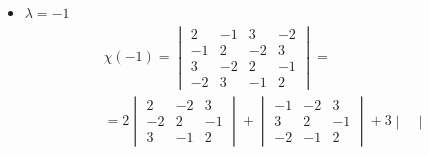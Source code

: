 \begin{itemize}
\begin{multline*}
\begin{vmatrix}
        	-2 & -1 \\
            3 & 0
        \end{vmatrix} + 3
        \begin{vmatrix}
        	3 & -2 \\
            -2 & 3
        \end{vmatrix} \right) + 2 \left( -
        \begin{vmatrix}
        	-2 & 0 \\
            3 & -1
        \end{vmatrix} - 2
        \begin{vmatrix}
        	3 & -2 \\
            -2 & 3
        \end{vmatrix} \right) = \\
        = 2(-2) + (1 - 9) + 3 \bigg( -(-(-3)) + 3(9 - 4) \bigg) + 2 \bigg( -(2) - 2(9 - 4) \bigg) = -4 - 8 + 3(-3 + 15) + 2(-2 - 10) = \\
        = -12 + 36 - 24 = 0
    \end{multline*}
    $$ \vec{u_1} =
    \begin{pmatrix}
    	1 \\
        1 \\
        1 \\
        1
    \end{pmatrix} $$
    \item $ \lambda = -1 $
    \begin{multline*}
        \chi(-1) =
        \begin{vmatrix}
            2 & -1 & 3 & -2 \\
            -1 & 2 & -2 & 3 \\
            3 & -2 & 2 & -1 \\
            -2 & 3 & -1 & 2
        \end{vmatrix} = \\
        = 2
        \begin{vmatrix}
        	2 & -2 & 3 \\
            -2 & 2 & -1 \\
            3 & -1 & 2
        \end{vmatrix} +
        \begin{vmatrix}
        	-1 & -2 & 3 \\
            3 & 2 & -1 \\
            -2 & -1 & 2
        \end{vmatrix} + 3
        \begin{vmatrix}

\end{vmatrix}
\end{multline*}
\end{itemize}
